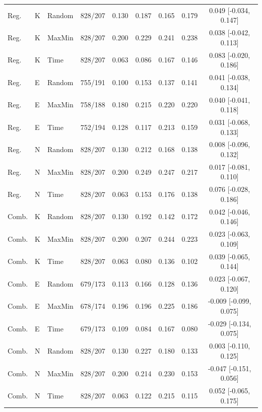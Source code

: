 \begin{longtable}{llllccccc}
Reg. & K & Random & 828/207 & 0.130 & 0.187 & 0.165 & 0.179 & 0.049 [-0.034, 0.147] \\

Reg. & K & MaxMin & 828/207 & 0.200 & 0.229 & 0.241 & 0.238 & 0.038 [-0.042, 0.113] \\

Reg. & K & Time & 828/207 & 0.063 & 0.086 & 0.167 & 0.146 & 0.083 [-0.020, 0.186] \\

Reg. & E & Random & 755/191 & 0.100 & 0.153 & 0.137 & 0.141 & 0.041 [-0.038, 0.134] \\

Reg. & E & MaxMin & 758/188 & 0.180 & 0.215 & 0.220 & 0.220 & 0.040 [-0.041, 0.118] \\

Reg. & E & Time & 752/194 & 0.128 & 0.117 & 0.213 & 0.159 & 0.031 [-0.068, 0.133] \\

Reg. & N & Random & 828/207 & 0.130 & 0.212 & 0.168 & 0.138 & 0.008 [-0.096, 0.132] \\

Reg. & N & MaxMin & 828/207 & 0.200 & 0.249 & 0.247 & 0.217 & 0.017 [-0.081, 0.110] \\

Reg. & N & Time & 828/207 & 0.063 & 0.153 & 0.176 & 0.138 & 0.076 [-0.028, 0.186] \\

Comb. & K & Random & 828/207 & 0.130 & 0.192 & 0.142 & 0.172 & 0.042 [-0.046, 0.146] \\

Comb. & K & MaxMin & 828/207 & 0.200 & 0.207 & 0.244 & 0.223 & 0.023 [-0.063, 0.109] \\

Comb. & K & Time & 828/207 & 0.063 & 0.080 & 0.136 & 0.102 & 0.039 [-0.065, 0.144] \\

Comb. & E & Random & 679/173 & 0.113 & 0.166 & 0.128 & 0.136 & 0.023 [-0.067, 0.120] \\

Comb. & E & MaxMin & 678/174 & 0.196 & 0.196 & 0.225 & 0.186 & -0.009 [-0.099, 0.075] \\

Comb. & E & Time & 679/173 & 0.109 & 0.084 & 0.167 & 0.080 & -0.029 [-0.134, 0.075] \\

Comb. & N & Random & 828/207 & 0.130 & 0.227 & 0.180 & 0.133 & 0.003 [-0.110, 0.125] \\

Comb. & N & MaxMin & 828/207 & 0.200 & 0.214 & 0.230 & 0.153 & -0.047 [-0.151, 0.056] \\

Comb. & N & Time & 828/207 & 0.063 & 0.122 & 0.215 & 0.115 & 0.052 [-0.065, 0.175] \\

\end{longtable}\endgroup

